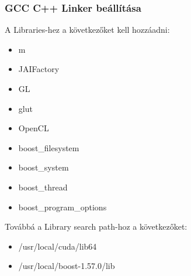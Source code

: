 \subsubsection*{GCC C++ Linker beállítása}
	A Libraries-hez a következőket kell hozzáadni:
	\begin{itemize}[noitemsep]
		\item m
		\item JAIFactory
		\item GL
		\item glut
		\item OpenCL
		\item boost\_filesystem
		\item boost\_system
		\item boost\_thread
		\item boost\_program\_options
	\end{itemize}
	Továbbá a Library search path-hoz a következőket:
	\begin{itemize}
		\item /usr/local/cuda/lib64
		\item /usr/local/boost-1.57.0/lib
	\end{itemize}


